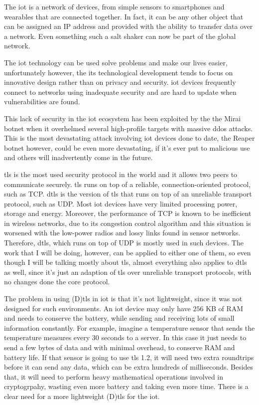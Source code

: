 \documentclass{llncs}
\begin{document}
The \gls{iot} is a network of devices, from simple sensors to smartphones and wearables
that are connected together. In fact, it can be any other object that can be assigned
an IP address and provided with the ability to transfer data over a network. Even
something such a salt shaker\cite{SMALTThe76:online} can now be part of the global network.

The \gls{iot} technology can be used solve problems and make our lives easier,
unfortunately however, the its technological development tends to focus on
innovative design rather than on privacy and security. \gls{iot} devices frequently
connect to networks using inadequate security and are hard to update when vulnerabilities
are found.

This lack of security in the \gls{iot} ecosystem has been exploited by the
the Mirai botnet\cite{sec17ant94:online} when it overhelmed several high-profile
targets with massive \gls{ddos} attacks. This is the most devastating attack involving \gls{iot}
devices done to date, the Reaper botnet\cite{ReaperCa10:online} however, could be
even more devastating, if it's ever put to malicious use and others will inadvertently
come in the future.

\gls{tls} is the most used security protocol in the world and it allows two peers
to communicate securely. \gls{tls} runs on top of a reliable, connection-oriented
protocol, such as TCP. \gls{dtls} is the version of \gls{tls} that runs on top
of an unreliable transport protocol, such as UDP. Most \gls{iot} devices have
very limited processing power, storage and energy. Moreover, the performance of
TCP is known to be inefficient in wireless networks, due to its congestion control
algorithm and this situation is worsened with the low-power radios and lossy
links found in sensor networks. Therefore, \gls{dtls}, which runs on top
of UDP is mostly used in such devices. The work that I will be doing, however,
can be applied to either one of them, so even though I will be talking mostly
about \gls{tls}, almost everything also applies to \gls{dtls} as well, since it's just
an adaption of \gls{tls} over unreliable transport protocols, with no changes done
the core protocol.

The problem in using (D)\gls{tls} in \gls{iot} is that it's not lightweight, since
it was not designed for such environments. An \gls{iot} device may only have
$256$ KB of RAM and needs to conserve the battery, while sending and receiving
lots of small information constantly. For example, imagine a temperature sensor
that sends the temperature measures every $30$ seconds to a server. In this case
it just needs to send a few bytes of data and with minimal overhead, to conserve
RAM and battery life. If that sensor is going to use \gls{tls} 1.2, it will need
two extra roundtrips before it can send any data, which can be extra hundreds of
milliseconds. Besides that, it will need to perform heavy mathematical operations
involved in cryptogrpahy, wasting even more battery and taking even more time.
There is a clear need for a more lightweight (D)\gls{tls} for the \gls{iot}.
\end{document}
